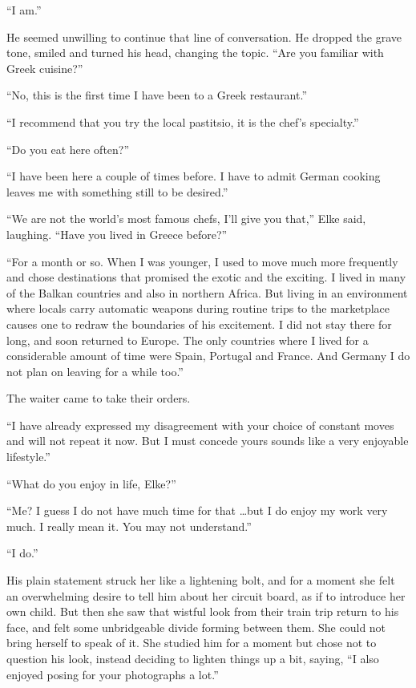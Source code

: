 ``I am.''

He seemed unwilling to continue that line of conversation. He dropped the grave tone, smiled and turned his head, changing the topic. ``Are you familiar with Greek cuisine?''

``No, this is the first time I have been to a Greek restaurant.''

``I recommend that you try the local pastitsio, it is the chef's specialty.''

``Do you eat here often?''

``I have been here a couple of times before. I have to admit German cooking leaves me with something still to be desired.''

``We are not the world's most famous chefs, I'll give you that,'' Elke said, laughing. ``Have you lived in Greece before?''

``For a month or so. When I was younger, I used to move much more frequently and chose destinations that promised the exotic and the exciting. I lived in many of the Balkan countries and also in northern Africa. But living in an environment where locals carry automatic weapons during routine trips to the marketplace causes one to redraw the boundaries of his excitement. I did not stay there for long, and soon returned to Europe. The only countries where I lived for a considerable amount of time were Spain, Portugal and France. And Germany I do not plan on leaving for a while too.''

The waiter came to take their orders.

``I have already expressed my disagreement with your choice of constant moves and will not repeat it now. But I must concede yours sounds like a very enjoyable lifestyle.''

``What do you enjoy in life, Elke?''

``Me? I guess I do not have much time for that \ldots but I do enjoy my work very much. I really mean it. You may not understand.''

``I do.''

His plain statement struck her like a lightening bolt, and for a moment she felt an overwhelming desire to tell him about her circuit board, as if to introduce her own child. But then she saw that wistful look from their train trip return to his face, and felt some unbridgeable divide forming between them. She could not bring herself to speak of it. She studied him for a moment but chose not to question his look, instead deciding to lighten things up a bit, saying, ``I also enjoyed posing for your photographs a lot.''

